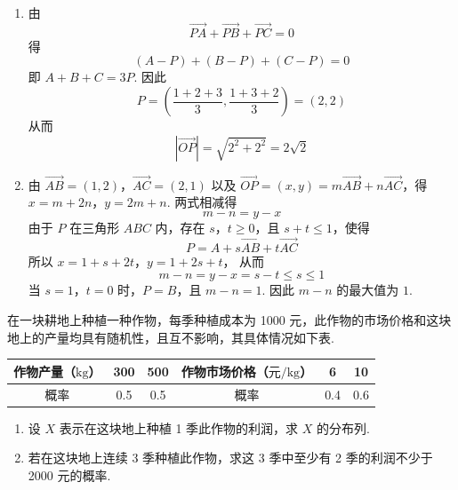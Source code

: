 \begin{solution}
\begin{enumerate}
\item 由
\[
\overrightarrow{PA}+\overrightarrow{PB}+\overrightarrow{PC}=0
\]
得
\[
(A-P)+(B-P)+(C-P)=0
\]
即 \(A+B+C=3P\). 因此
\[
P=\left(\frac{1+2+3}{3},\frac{1+3+2}{3}\right)=(2,2)
\]
从而
\[
\left|\overrightarrow{OP}\right|=\sqrt{2^2+2^2}=2\sqrt2
\]

\item 由
\(\overrightarrow{AB}=(1,2)\)，\(\overrightarrow{AC}=(2,1)\)
以及 \(\overrightarrow{OP}=(x,y)=m\overrightarrow{AB}+n\overrightarrow{AC}\)，得
\(x=m+2n\)，\(y=2m+n\).
两式相减得
\[
m-n=y-x
\]
由于 \(P\) 在三角形 \(ABC\) 内，存在 \(s\)，\(t\geqslant0\)，且 \(s+t\leqslant1\)，使得
\[
P=A+s\overrightarrow{AB}+t\overrightarrow{AC}
\]
所以
\(x=1+s+2t\)，\(y=1+2s+t\)，
从而
\[
m-n=y-x=s-t\leqslant s\leqslant1
\]
当 \(s=1\)，\(t=0\) 时，\(P=B\)，且 \(m-n=1\). 因此 \(m-n\) 的最大值为 \(1\).
\end{enumerate}
\end{solution}

\begin{problem}
在一块耕地上种植一种作物，每季种植成本为 1000 元，此作物的市场价格和这块地上的产量均具有随机性，且互不影响，其具体情况如下表.

\begin{center}
\small
\begin{tabular}{c|cc c|cc}
\hline
作物产量（\(\mathrm{kg}\)） & 300 & 500 & 作物市场价格（\(\text{元/kg}\)） & 6 & 10 \\
\hline
概率 & 0.5 & 0.5 & 概率 & 0.4 & 0.6 \\
\hline
\end{tabular}
\end{center}

\begin{enumerate}
\item 设 \(X\) 表示在这块地上种植 1 季此作物的利润，求 \(X\) 的分布列.
\item 若在这块地上连续 3 季种植此作物，求这 3 季中至少有 2 季的利润不少于 2000 元的概率.
\end{enumerate}
\end{problem}


